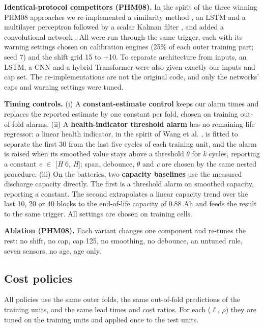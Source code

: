 \documentclass[a4paper,fleqn,doubleblind]{cas-dc}
\begin{document}
\textbf{Identical-protocol competitors (PHM08).} In the spirit of the three winning PHM08 approaches we re-implemented a similarity method \cite{wang2008}, an LSTM \cite{heimes2008,zheng2017} and a multilayer perceptron followed by a scalar Kalman filter \cite{peel2008}, and added a convolutional network \cite{li2018}. All were run through the same trigger, each with its warning settings chosen on calibration engines (25\% of each outer training part; seed 7) and the shift grid \textminus{}15 to +10. To separate architecture from inputs, an LSTM, a CNN and a hybrid Transformer were also given exactly our inputs and cap set. The re-implementations are not the original code, and only the networks' caps and warning settings were tuned.

\textbf{Timing controls.} (i) A \textbf{constant-estimate control} keeps our alarm times and replaces the reported estimate by one constant per fold, chosen on training out-of-fold alarms. (ii) A \textbf{health-indicator threshold alarm} has no remaining-life regressor: a linear health indicator, in the spirit of Wang et al. \cite{wang2008}, is fitted to separate the first 30 from the last five cycles of each training unit, and the alarm is raised when its smoothed value stays above a threshold $\theta$ for \textit{k} cycles, reporting a constant \textit{c} $\in$ [\textit{H} \textminus{} 6, \textit{H}]; span, debounce, $\theta$ and \textit{c} are chosen by the same nested procedure. (iii) On the batteries, two \textbf{capacity baselines} use the measured discharge capacity directly. The first is a threshold alarm on smoothed capacity, reporting a constant. The second extrapolates a linear capacity trend over the last 10, 20 or 40 blocks to the end-of-life capacity of 0.88 Ah and feeds the result to the same trigger. All settings are chosen on training cells.

\textbf{Ablation (PHM08).} Each variant changes one component and re-tunes the rest: no shift, no cap, cap 125, no smoothing, no debounce, an untuned rule, seven sensors, no age, age only.

\subsection{Cost policies}

All policies use the same outer folds, the same out-of-fold predictions of the training units, and the same lead times and cost ratios. For each ($\ell$, $\rho$) they are tuned on the training units and applied once to the test units.
\end{document}
